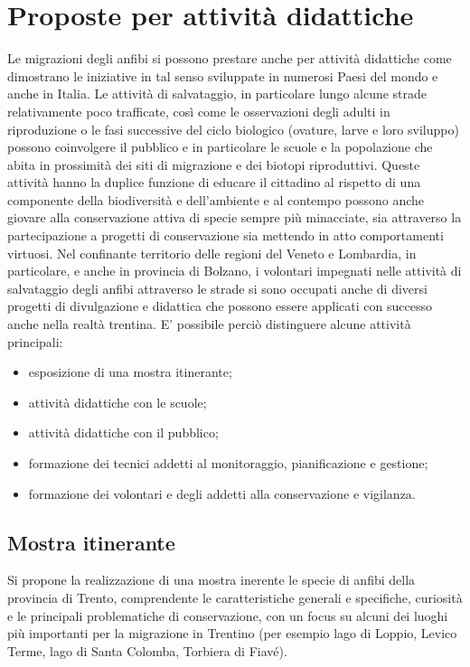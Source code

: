 \documentclass[11pt,a4paper,twoside]{memoir}
\begin{document}
\chapter{Proposte per attività didattiche}
Le migrazioni degli anfibi si possono prestare anche per attività didattiche come dimostrano le iniziative in tal senso sviluppate in numerosi Paesi del mondo e anche in Italia.
Le attività di salvataggio, in particolare lungo alcune strade relativamente poco trafficate, così come le osservazioni degli adulti in riproduzione o le fasi successive del ciclo biologico (ovature, larve e loro sviluppo) possono coinvolgere il pubblico e in particolare le scuole e la popolazione che abita in prossimità dei siti di migrazione e dei biotopi riproduttivi.
Queste attività hanno la duplice funzione di educare il cittadino al rispetto di una componente della biodiversità e dell'ambiente e al contempo possono anche giovare alla conservazione attiva di specie sempre più minacciate, sia attraverso la partecipazione a progetti di conservazione sia mettendo in atto comportamenti virtuosi.
Nel confinante territorio delle regioni del Veneto e Lombardia, in particolare, e anche in provincia di Bolzano, i volontari impegnati nelle attività di salvataggio degli anfibi attraverso le strade si sono occupati anche di diversi progetti di divulgazione e didattica che possono essere applicati con successo anche nella realtà trentina.
E' possibile perciò distinguere alcune attività principali:

\begin{itemize}\itemsep0pt
  \item esposizione di una mostra itinerante;
  \item attività didattiche con le scuole;
  \item attività didattiche con il pubblico;
  \item formazione dei tecnici addetti al monitoraggio, pianificazione e gestione;
  \item formazione dei volontari e degli addetti alla conservazione e vigilanza.
\end{itemize}

\section{Mostra itinerante}
Si propone la realizzazione di una mostra inerente le specie di anfibi della provincia di Trento, comprendente le caratteristiche generali e specifiche, curiosità e le principali problematiche di conservazione, con un focus su alcuni dei luoghi più importanti per la migrazione in Trentino (per esempio lago di Loppio, Levico Terme, lago di Santa Colomba, Torbiera di Fiavé).
\end{document}
